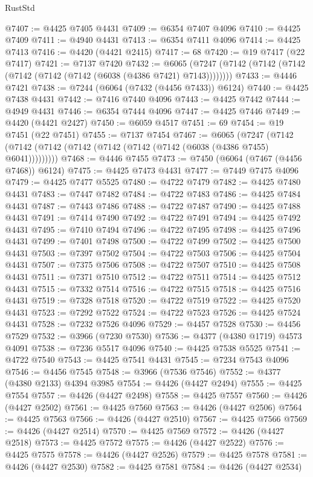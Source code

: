 \begin{lexlean}{RustStd}
\begin{coremodule}
@7407 := @4425 @7405 @4431
@7409 := @6354 @7407 @4096
@7410 := @4425 @7409
@7411 := @4940 @4431
@7413 := @6354 @7411 @4096
@7414 := @4425 @7413
@7416 := @4420 (@4421 @2415)
@7417 := 68
@7420 := @19 @7417 (@22 @7417)
@7421 := @7137 @7420
@7432 := @6065 (@7247 (@7142 (@7142 (@7142 (@7142 (@7142 (@7142 (@6038 (@4386 @7421) @7143))))))))
@7433 := @4446 @7421
@7438 := @7244 (@6064 (@7432 (@4456 @7433)) @6124)
@7440 := @4425 @7438 @4431
@7442 := @7416 @7440 @4096
@7443 := @4425 @7442
@7444 := @4949 @4431
@7446 := @6354 @7444 @4096
@7447 := @4425 @7446
@7449 := @4420 (@4421 @2427)
@7450 := @6059 @4517
@7451 := 69
@7454 := @19 @7451 (@22 @7451)
@7455 := @7137 @7454
@7467 := @6065
    (@7247 (@7142 (@7142 (@7142 (@7142 (@7142 (@7142 (@7142 (@6038 (@4386 @7455) @6041)))))))))
@7468 := @4446 @7455
@7473 := @7450 (@6064 (@7467 (@4456 @7468)) @6124)
@7475 := @4425 @7473 @4431
@7477 := @7449 @7475 @4096
@7479 := @4425 @7477 @5525
@7480 := @4722 @7479
@7482 := @4425 @7480 @4431
@7483 := @7447 @7482
@7484 := @4722 @7483
@7486 := @4425 @7484 @4431
@7487 := @7443 @7486
@7488 := @4722 @7487
@7490 := @4425 @7488 @4431
@7491 := @7414 @7490
@7492 := @4722 @7491
@7494 := @4425 @7492 @4431
@7495 := @7410 @7494
@7496 := @4722 @7495
@7498 := @4425 @7496 @4431
@7499 := @7401 @7498
@7500 := @4722 @7499
@7502 := @4425 @7500 @4431
@7503 := @7397 @7502
@7504 := @4722 @7503
@7506 := @4425 @7504 @4431
@7507 := @7375 @7506
@7508 := @4722 @7507
@7510 := @4425 @7508 @4431
@7511 := @7371 @7510
@7512 := @4722 @7511
@7514 := @4425 @7512 @4431
@7515 := @7332 @7514
@7516 := @4722 @7515
@7518 := @4425 @7516 @4431
@7519 := @7328 @7518
@7520 := @4722 @7519
@7522 := @4425 @7520 @4431
@7523 := @7292 @7522
@7524 := @4722 @7523
@7526 := @4425 @7524 @4431
@7528 := @7232 @7526 @4096
@7529 := @4457 @7528
@7530 := @4456 @7529
@7532 := @3966 (@7230 @7530)
@7536 := @4377 (@4380 @1719) @4573 @4091
@7538 := @7236 @5517 @4096
@7540 := @4425 @7538 @5525
@7541 := @4722 @7540
@7543 := @4425 @7541 @4431
@7545 := @7234 @7543 @4096
@7546 := @4456 @7545
@7548 := @3966 (@7536 @7546)
@7552 := @4377 (@4380 @2133) @4394 @3985
@7554 := @4426 (@4427 @2494)
@7555 := @4425 @7554
@7557 := @4426 (@4427 @2498)
@7558 := @4425 @7557
@7560 := @4426 (@4427 @2502)
@7561 := @4425 @7560
@7563 := @4426 (@4427 @2506)
@7564 := @4425 @7563
@7566 := @4426 (@4427 @2510)
@7567 := @4425 @7566
@7569 := @4426 (@4427 @2514)
@7570 := @4425 @7569
@7572 := @4426 (@4427 @2518)
@7573 := @4425 @7572
@7575 := @4426 (@4427 @2522)
@7576 := @4425 @7575
@7578 := @4426 (@4427 @2526)
@7579 := @4425 @7578
@7581 := @4426 (@4427 @2530)
@7582 := @4425 @7581
@7584 := @4426 (@4427 @2534)

\end{coremodule}
\end{lexlean}
